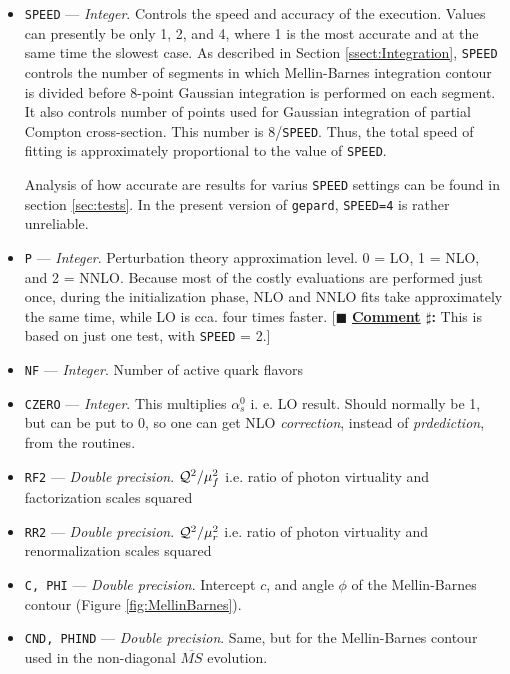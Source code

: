 \documentclass[12pt]{article}
\newcounter{comment}
\newcommand{\comminline}[1]{{%
\refstepcounter{comment}%
\ttfamily\small[$\blacksquare$ \textbf{\underline{Comment}
$\sharp$\thecomment:} #1]}}
\begin{document}
\begin{itemize}
\item
\texttt{SPEED} --- \emph{Integer}. Controls the speed and accuracy of the execution. Values can
presently be only 1, 2, and 4, where 1 is the most accurate and at the
same time the slowest case.
As described in Section \ref{ssect:Integration}, \texttt{SPEED} controls the number
of segments in which Mellin-Barnes integration contour is divided before 8-point
Gaussian integration is performed on each segment. It also controls number of
points used for Gaussian integration of partial Compton cross-section. This
number is 8/\texttt{SPEED}.  Thus, the total speed of fitting is approximately
proportional to the
value of \texttt{SPEED}. 

Analysis of how accurate are results for varius \texttt{SPEED} settings can
be found in section \ref{sec:tests}. In the present version of \texttt{gepard},
\texttt{SPEED=4} is rather unreliable.

\item
\texttt{P} --- \emph{Integer}. Perturbation theory approximation level. 0 = LO, 1 = NLO, and
  2 = NNLO. Because most of the costly evaluations are performed just once,
  during the initialization phase, NLO and NNLO fits take approximately the
  same time, while LO is cca. four times faster. \comminline{This is based
  on just one test, with \texttt{SPEED} = 2.}

\item
\texttt{NF} --- \emph{Integer}. Number of active quark flavors

\item
\texttt{CZERO} --- \emph{Integer}. This multiplies $\alpha_{s}^{0}$ i. e. LO result.
  Should normally be 1, but can be put to 0, so one can get NLO \emph{correction},
  instead of \emph{prdediction}, from the routines.

\item
\texttt{RF2} --- \emph{Double precision}. $ {\cal Q}^2/{\mu_{f}^2}$ i.e. ratio
of photon virtuality and factorization scales squared

\item
\texttt{RR2} --- \emph{Double precision}. $ {\cal Q}^2/{\mu_{r}^2}$ i.e. ratio
of photon virtuality and renormalization scales squared

\item
\texttt{C, PHI} --- \emph{Double precision}. Intercept $c$, and angle $\phi$ of
the Mellin-Barnes contour (Figure \ref{fig:MellinBarnes}).

\item
\texttt{CND, PHIND} --- \emph{Double precision}. Same, but for 
the Mellin-Barnes contour used in the non-diagonal $\overline{MS}$ evolution.


\end{itemize}
\end{document}
